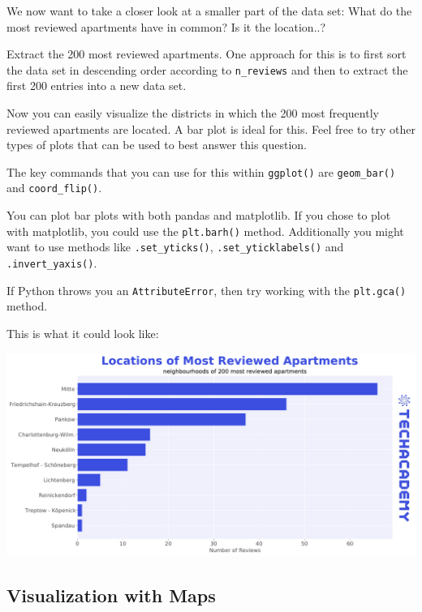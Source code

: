 \documentclass[
  11pt,
]{article}
\newenvironment{tips}[1]
  {
  \begin{itemize}
  \footnotesize
  \renewcommand{\labelitemi}{
    \raisebox{-.7\height}[0pt][0pt]{
      {\setkeys{Gin}{width=3em,keepaspectratio}
        \texttt{[image: images/\#1.png]}}
    }
  }
  \setlength{\fboxsep}{1em}
  \begin{rbox}
  \item
  }
  {
  \end{rbox}
  \end{itemize}
  }
\newenvironment{tipsp}[1]
  {
  \begin{itemize}
  \footnotesize
  \renewcommand{\labelitemi}{
    \raisebox{-.7\height}[0pt][0pt]{
      {\setkeys{Gin}{width=3em,keepaspectratio}
        \texttt{[image: images/\#1.png]}}
    }
  }
  \setlength{\fboxsep}{1em}
  \begin{pbox}
  \item
  }
  {
  \end{pbox}
  \end{itemize}
  }
\begin{document}
We now want to take a closer look at a smaller part of the data set: What do the most reviewed apartments have in common? Is it the location..?

Extract the 200 most reviewed apartments. One approach for this is to first sort the data set in descending order according to \texttt{n\_reviews} and then to extract the first 200 entries into a new data set.

Now you can easily visualize the districts in which the 200 most frequently reviewed apartments are located. A bar plot is ideal for this. Feel free to try other types of plots that can be used to best answer this question.

\begin{tips}r
The key commands that you can use for this within \texttt{ggplot()} are \texttt{geom\_bar()} and \texttt{coord\_flip()}.

\end{tips}

\begin{tipsp}p
You can plot bar plots with both pandas and matplotlib.
If you chose to plot with matplotlib, you could use the \texttt{plt.barh()} method. Additionally you might want to use methods like \texttt{.set\_yticks()}, \texttt{.set\_yticklabels()} and \texttt{.invert\_yaxis()}.

If Python throws you an \texttt{AttributeError}, then try working with the \texttt{plt.gca()} method.

\end{tipsp}

This is what it could look like:

\begin{center}\includegraphics[width=1\linewidth]{plot/01_python/hbars_reviews} \end{center}

\hypertarget{visualization-with-maps}{%
\subsection{Visualization with Maps}\label{visualization-with-maps}}
\end{document}
